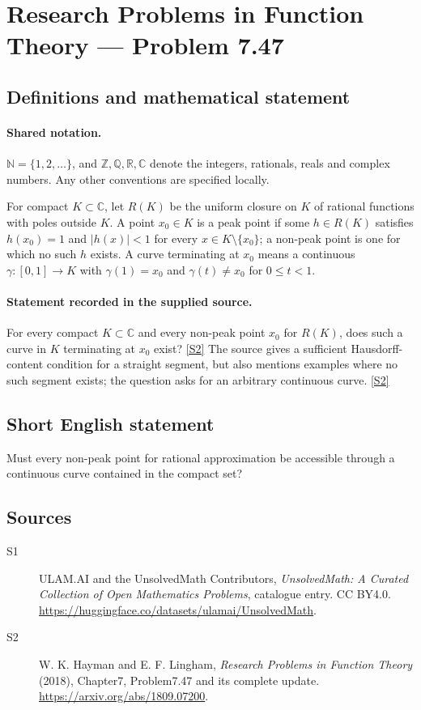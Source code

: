 \documentclass[11pt]{article}
\newcommand{\sref}[2]{\hyperlink{source:#1:#2}{[S#2]}}
\begin{document}
\section{Research Problems in Function Theory — Problem 7.47}\label{statement}

\subsection{Definitions and mathematical statement}

\paragraph{Shared notation.}$\mathbb N=\{1,2,\ldots\}$, and $\mathbb Z,\mathbb Q,\mathbb R,\mathbb C$ denote the integers, rationals, reals and complex numbers. Any other conventions are specified locally.


For compact $K\subset\mathbb C$, let $R(K)$ be the uniform closure on $K$ of rational functions with poles outside $K$. A point $x_0\in K$ is a peak point if some $h\in R(K)$ satisfies $h(x_0)=1$ and $|h(x)|<1$ for every $x\in K\setminus\{x_0\}$; a non-peak point is one for which no such $h$ exists. A curve terminating at $x_0$ means a continuous $\gamma:[0,1]\to K$ with $\gamma(1)=x_0$ and $\gamma(t)\ne x_0$ for $0\le t<1$.

\paragraph{Statement recorded in the supplied source.}
For every compact $K\subset\mathbb C$ and every non-peak point $x_0$ for $R(K)$, does such a curve in $K$ terminating at $x_0$ exist? \sref{statement}{2}
The source gives a sufficient Hausdorff-content condition for a straight segment, but also mentions examples where no such segment exists; the question asks for an arbitrary continuous curve. \sref{statement}{2}
\subsection{Short English statement}
Must every non-peak point for rational approximation be accessible through a continuous curve contained in the compact set?
\subsection{Sources}
\begin{description}
\item[\hypertarget{source:statement:1}{S1}] ULAM.AI and the UnsolvedMath Contributors, \emph{UnsolvedMath: A Curated Collection of Open Mathematics Problems}, catalogue entry. CC BY4.0. \url{https://huggingface.co/datasets/ulamai/UnsolvedMath}.
\item[\hypertarget{source:statement:2}{S2}] W. K. Hayman and E. F. Lingham, \emph{Research Problems in Function Theory} (2018), Chapter7, Problem7.47 and its complete update. \url{https://arxiv.org/abs/1809.07200}.
\end{description}
\label{end:statement}
\end{document}
